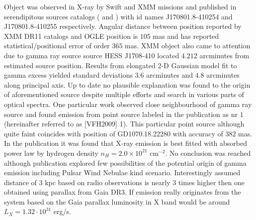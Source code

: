 \documentclass{pracalicmgr}
\begin{document}
Object was observed in X-ray by Swift and XMM missions and published in serendipitous sources catalogs (\citep{evans_2sxps_2020} and \citep{traulsen_xmm-newton_2020}) with id names J170801.8-410254 and J170801.8-410255
respectively. Angular distance between position reported by XMM DR11 catalogs \citep{traulsen_xmm-newton_2020}  and OGLE position is $105$ mas and has reported statistical/positional error of order $365$ mas.
XMM object also came to attention 
due to gamma ray source source HESS J1708-410 \citep{aharonian_hess_2008} located $4.212$ arcminutes from estimated source position. Results from elongated 2-D Gaussian model fit to gamma 
excess yielded standard deviations $3.6$ arcminutes and $4.8$ arcminutes along principal axis. Up to date no plausible explanation was found to the origin
of aforementioned source despite multiple efforts and search in various parts of optical spectra. One particular work \citep{van_etten_multi-wavelength_2009} observed close neighbourhood of
gamma ray source and found emission from point source labeled in the publication as nr $1$ (hereinafter referred to as [VFH2009] 1).
This particular point source although quite faint coincides with  position of GD1070.18.22280 with accuracy of $382$ mas. 
In the publication it was found that X-ray emission is best fitted with absorbed power law by hydrogen density $n_H=2.0\times 10^{21}$ $\textrm{cm}^{-2}$.
No conclusion was reached although publication explored few possibilities of the potential origin of gamma emission including Pulsar Wind Nebulae kind scenario. Interestingly assumed 
distance of $3$ kpc based on radio observations is nearly $3$ times higher then one obtained using parallax from Gaia DR3. If emission really originates from the system 
based on the Gaia parallax luminosity in X band would be around $L_{X}=1.32\cdot10^{31}$ erg/s. 
\end{document}
